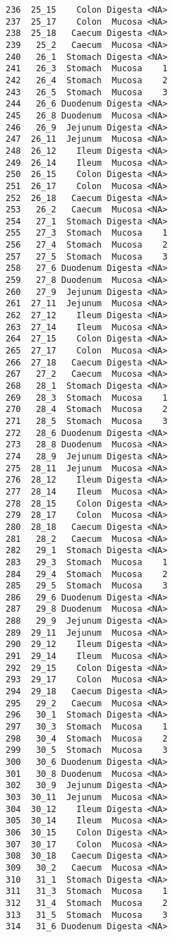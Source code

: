 \documentclass[
  letterpaper,
  DIV=11,
  numbers=noendperiod]{scrartcl}
\begin{document}
\begin{verbatim}
236  25_15    Colon Digesta <NA>
237  25_17    Colon  Mucosa <NA>
238  25_18   Caecum Digesta <NA>
239   25_2   Caecum  Mucosa <NA>
240   26_1  Stomach Digesta <NA>
241   26_3  Stomach  Mucosa    1
242   26_4  Stomach  Mucosa    2
243   26_5  Stomach  Mucosa    3
244   26_6 Duodenum Digesta <NA>
245   26_8 Duodenum  Mucosa <NA>
246   26_9  Jejunum Digesta <NA>
247  26_11  Jejunum  Mucosa <NA>
248  26_12    Ileum Digesta <NA>
249  26_14    Ileum  Mucosa <NA>
250  26_15    Colon Digesta <NA>
251  26_17    Colon  Mucosa <NA>
252  26_18   Caecum Digesta <NA>
253   26_2   Caecum  Mucosa <NA>
254   27_1  Stomach Digesta <NA>
255   27_3  Stomach  Mucosa    1
256   27_4  Stomach  Mucosa    2
257   27_5  Stomach  Mucosa    3
258   27_6 Duodenum Digesta <NA>
259   27_8 Duodenum  Mucosa <NA>
260   27_9  Jejunum Digesta <NA>
261  27_11  Jejunum  Mucosa <NA>
262  27_12    Ileum Digesta <NA>
263  27_14    Ileum  Mucosa <NA>
264  27_15    Colon Digesta <NA>
265  27_17    Colon  Mucosa <NA>
266  27_18   Caecum Digesta <NA>
267   27_2   Caecum  Mucosa <NA>
268   28_1  Stomach Digesta <NA>
269   28_3  Stomach  Mucosa    1
270   28_4  Stomach  Mucosa    2
271   28_5  Stomach  Mucosa    3
272   28_6 Duodenum Digesta <NA>
273   28_8 Duodenum  Mucosa <NA>
274   28_9  Jejunum Digesta <NA>
275  28_11  Jejunum  Mucosa <NA>
276  28_12    Ileum Digesta <NA>
277  28_14    Ileum  Mucosa <NA>
278  28_15    Colon Digesta <NA>
279  28_17    Colon  Mucosa <NA>
280  28_18   Caecum Digesta <NA>
281   28_2   Caecum  Mucosa <NA>
282   29_1  Stomach Digesta <NA>
283   29_3  Stomach  Mucosa    1
284   29_4  Stomach  Mucosa    2
285   29_5  Stomach  Mucosa    3
286   29_6 Duodenum Digesta <NA>
287   29_8 Duodenum  Mucosa <NA>
288   29_9  Jejunum Digesta <NA>
289  29_11  Jejunum  Mucosa <NA>
290  29_12    Ileum Digesta <NA>
291  29_14    Ileum  Mucosa <NA>
292  29_15    Colon Digesta <NA>
293  29_17    Colon  Mucosa <NA>
294  29_18   Caecum Digesta <NA>
295   29_2   Caecum  Mucosa <NA>
296   30_1  Stomach Digesta <NA>
297   30_3  Stomach  Mucosa    1
298   30_4  Stomach  Mucosa    2
299   30_5  Stomach  Mucosa    3
300   30_6 Duodenum Digesta <NA>
301   30_8 Duodenum  Mucosa <NA>
302   30_9  Jejunum Digesta <NA>
303  30_11  Jejunum  Mucosa <NA>
304  30_12    Ileum Digesta <NA>
305  30_14    Ileum  Mucosa <NA>
306  30_15    Colon Digesta <NA>
307  30_17    Colon  Mucosa <NA>
308  30_18   Caecum Digesta <NA>
309   30_2   Caecum  Mucosa <NA>
310   31_1  Stomach Digesta <NA>
311   31_3  Stomach  Mucosa    1
312   31_4  Stomach  Mucosa    2
313   31_5  Stomach  Mucosa    3
314   31_6 Duodenum Digesta <NA>

\end{verbatim}
\end{document}
